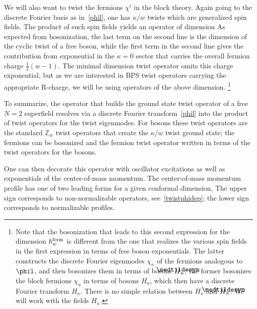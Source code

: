 \documentclass[12pt]{article}
\newcommand\lowermedtildesym{%
  \text{\smash{\raisebox{-1.2ex}{%
    $\medtildesym$}}}}
\newcommand\medtilde[1]{%
  \mathchoice
    {\accentset{\displaystyle\lowermedtildesym}{#1}}
    {\accentset{\textstyle\lowermedtildesym}{#1}}
    {\accentset{\scriptstyle\lowermedtildesym}{#1}}
    {\accentset{\scriptscriptstyle\lowermedtildesym}{#1}}
}
\def\half{\frac12}
\def\coeff#1#2{{\textstyle \frac{#1}{#2}}}
\def\hf{\coeff12}
\newcommand{\bZ}{{\mathbb Z}}
\numberwithin{equation}{section}
\def\coeff#1#2{{\textstyle{\frac{#1}{ #2}}}}
\def\half{\frac12}
\def\hf{{\textstyle\half}}
\def\exp{{\rm exp}}
\begin{document}
\begin{appendices}
We will also want to twist the fermions $\chi^i$ in the block theory.  
Again going to the discrete Fourier basis as in~\eqref{phil}, one has $\kappa/w$ twists which are generalized spin fields.  The product of such spin fields 
yields an operator of dimension 
As expected from bosonization, the last term on the second line is the dimension of the cyclic twist of a free boson, while the first term in the second line gives the contribution from exponential in the $\kappa=0$ sector that carries the overall fermion charge $\hf(w-1)$. 
The minimal dimension twist operator omits this charge exponential, but as we are interested in BPS twist operators carrying the appropriate R-charge, we will be using operators of the above dimension.%
%
\footnote{Note that the bosonization that leads to this second expression for the dimension $h_w^{\rm ferm}$ is different from the one that realizes the various spin fields in the first expression in terms of free boson exponentials.  The latter constructs the discrete Fourier eigenmodes $\chi^{~}_\kappa$ of the fermions analogous to $\phil$, and then bosonizes them in terms of bosons $\medtilde H_\kappa$; the former bosonizes the block fermions $\chi^{~}_a$ in terms of bosons $H_a$, which then have a discrete Fourier transform $H_\kappa$.  There is no simple relation between $H_\kappa$ and $\medtilde H_\kappa$.  We will work with the fields $H_\kappa$. }

To summarize, the operator that builds the ground state twist operator of a free $N=2$ superfield resolves via a discrete Fourier transform~\eqref{phil} into the product of twist operators for the twist eigenmodes.  For bosons these twist operators are the standard $\bZ_w$ twist operators that create the $\kappa/w$ twist ground state; the fermions can be bosonized and the fermion twist operator written in terms of the twist operators for the bosons.  

One can then decorate this operator with oscillator excitations as well as exponentials of the center-of-mass momentum.  
%
The center-of-mass momentum profile has one of two leading forms for a given conformal dimension,  
\eqn[nonnormphi]{
\exp\Big[ -\half\tilde Q_\ell \phi_0 \pm \frac{Q_\ell}{\sqrt w}\Big(j -\half\Big)\phi_0 \Big] ~.
}
The upper sign corresponds to non-normalizable operators, see~\eqref{twistphidep}; the lower sign corresponds to normalizable profiles.



\end{appendices}
\end{document}
